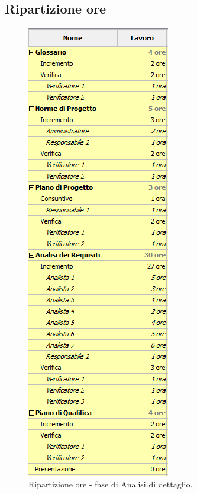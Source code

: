 \documentclass[a4paper]{report}
\begin{document}
			\subsection{Ripartizione ore}
				\begin{figure}[H]
					\centering
					\includegraphics[scale=0.6]{RODettaglio}
					\caption{Ripartizione ore - fase di Analisi di dettaglio.}
				\end{figure}
\end{document}
